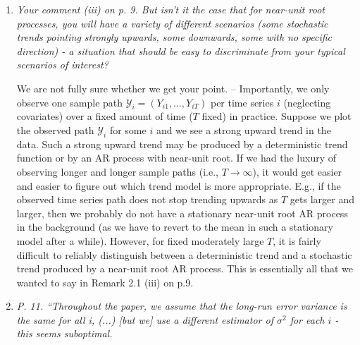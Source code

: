\documentclass[a4paper,12pt]{article}
\begin{document}
\begin{enumerate}[label=\arabic*.,leftmargin=0.6cm]
\item {\color{black}\textit{Your comment (iii) on p. 9. But isn’t it the case that for near-unit root processes, you will have a variety of different scenarios (some stochastic trends pointing strongly upwards, some downwards, some with no specific direction) - a situation that should be easy to discriminate from your typical scenarios of interest?}}

We are not fully sure whether we get your point. -- Importantly, we only observe one sample path $\mathcal{Y}_i = (Y_{i1},\ldots,Y_{iT})$ per time series $i$ (neglecting covariates) over a fixed amount of time ($T$ fixed) in practice. Suppose we plot the observed path $\mathcal{Y}_i$ for some $i$ and we see a strong upward trend in the data. Such a strong upward trend may be produced by a deterministic trend function or by an AR process with near-unit root. If we had the luxury of observing longer and longer sample paths (i.e., $T \to \infty$), it would get easier and easier to figure out which trend model is more appropriate. E.g., if the observed time series path does not stop trending upwards as $T$ gets larger and larger, then we probably do not have a stationary near-unit root AR process in the background (as we have to revert to the mean in such a stationary model after a while). However, for fixed moderately large $T$, it is fairly difficult to reliably distinguish between a deterministic trend and a stochastic trend produced by a near-unit root AR process. This is essentially all that we wanted to say in Remark 2.1 (iii) on p.9. 



\item {\color{black}\textit{P. 11. “Throughout the paper, we assume that the long-run error variance is the same for all i, (...) [but we] use a different estimator of $\sigma^2$ for each $i$ - this seems suboptimal.}}


\end{enumerate}
\end{document}

